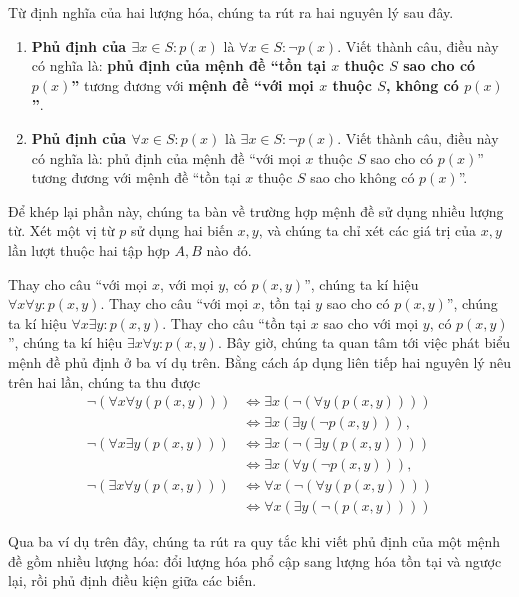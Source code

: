 Từ định nghĩa của hai lượng hóa, chúng ta rút ra hai nguyên lý sau đây.

\begin{enumerate}[label={(\roman*)}]
    \item \textbf{Phủ định của $\exists x\in S : p(x)$} là $\forall x\in S: \neg p(x)$. Viết thành câu, điều này có nghĩa là: \textbf{phủ định của mệnh đề  ``tồn tại $x$ thuộc $S$ sao cho có $p(x)$''} tương đương với \textbf{mệnh đề ``với mọi $x$ thuộc $S$, không có $p(x)$''}.
    \item \textbf{Phủ định của $\forall x\in S : p(x)$} là $\exists x\in S: \neg p(x)$. Viết thành câu, điều này có nghĩa là: phủ định của mệnh đề  ``với mọi $x$ thuộc $S$ sao cho có $p(x)$'' tương đương với mệnh đề ``tồn tại $x$ thuộc $S$ sao cho không có $p(x)$''.
\end{enumerate}

Để khép lại phần này, chúng ta bàn về trường hợp mệnh đề sử dụng nhiều lượng từ. Xét một vị từ $p$ sử dụng hai biến $x, y$, và chúng ta chỉ xét các giá trị của $x, y$ lần lượt thuộc hai tập hợp $A, B$ nào đó.

Thay cho câu ``với mọi $x$, với mọi $y$, có $p(x, y)$'', chúng ta kí hiệu $\forall x\forall y : p(x, y)$. Thay cho câu ``với mọi $x$, tồn tại $y$ sao cho có $p(x, y)$'', chúng ta kí hiệu $\forall x \exists y : p(x,y)$. Thay cho câu ``tồn tại $x$ sao cho với mọi $y$, có $p(x, y)$'', chúng ta kí hiệu $\exists x \forall y : p(x, y)$. Bây giờ, chúng ta quan tâm tới việc phát biểu mệnh đề phủ định ở ba ví dụ trên. Bằng cách áp dụng liên tiếp hai nguyên lý nêu trên hai lần, chúng ta thu được
\begin{align*}
    \neg(\forall x \forall y (p(x, y))) & \Leftrightarrow \exists x (\neg(\forall y (p(x, y))))  \\
                                        & \Leftrightarrow \exists x (\exists y (\neg p(x, y))),  \\
    \neg(\forall x\exists y (p(x, y)))  & \Leftrightarrow \exists x (\neg(\exists y (p(x, y))))  \\
                                        & \Leftrightarrow \exists x (\forall y (\neg p(x, y))),  \\
    \neg(\exists x\forall y (p(x, y)))  & \Leftrightarrow \forall x (\neg(\forall y( p(x, y))))  \\
                                        & \Leftrightarrow \forall x (\exists y (\neg (p(x, y))))
\end{align*}

Qua ba ví dụ trên đây, chúng ta rút ra quy tắc khi viết phủ định của một mệnh đề gồm nhiều lượng hóa: đổi lượng hóa phổ cập sang lượng hóa tồn tại và ngược lại, rồi phủ định điều kiện giữa các biến.

